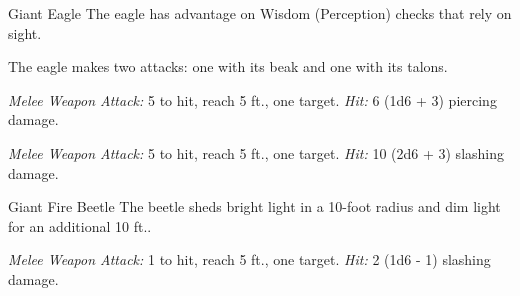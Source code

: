 \documentclass[10pt,a4paper,twoside,bg=print,twocolumn,openany,nodeprecatedcode]{dndbook}
\begin{document}
\clearpage

\begin{DndMonster}[float=t]{Giant Eagle}
\DndMonsterBasics[
armor-class = {13},
hit-points = {\DndDice{4d10 + 4}},
speed = {10 ft., fly 80 ft.}
]
\DndMonsterAbilityScores[
 str = 16,
 dex = 17,
 con = 13,
 int = 8,
 wis = 14,
 cha = 10
]
\DndMonsterDetails[
skills = {Perception +4},
languages = {Giant Eagle, understands Common and Auran but can't speak them},
challenge = 1,
]
The eagle has advantage on Wisdom (Perception) checks that rely on sight.

The eagle makes two attacks: one with its beak and one with its talons.

\textsl{Melee Weapon Attack:} 5 to hit, reach 5 ft., one target. \textsl{Hit:} 6 (1d6 + 3) piercing damage.

\textsl{Melee Weapon Attack:} 5 to hit, reach 5 ft., one target. \textsl{Hit:} 10 (2d6 + 3) slashing damage.

\end{DndMonster}



\begin{DndMonster}[float=t]{Giant Fire Beetle}
\DndMonsterBasics[
armor-class = {13 (natural armor)},
hit-points = {\DndDice{1d6 + 1}},
speed = {30 ft.}
]
\DndMonsterAbilityScores[
 str = 8,
 dex = 10,
 con = 12,
 int = 1,
 wis = 7,
 cha = 3
]
\DndMonsterDetails[
senses = {blindsight 30 ft., passive perception 8},
challenge = 0,
]
The beetle sheds bright light in a 10-foot radius and dim light for an additional 10 ft..

\textsl{Melee Weapon Attack:} 1 to hit, reach 5 ft., one target. \textsl{Hit:} 2 (1d6 - 1) slashing damage.

\end{DndMonster}
\end{document}
